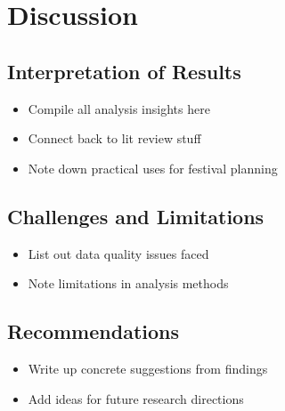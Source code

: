 \chapter{Discussion}
\label{ch:discussion}


\section{Interpretation of Results}
\label{sec:discussion-interpretation-results}
\begin{itemize}
    \item Compile all analysis insights here
    \item Connect back to lit review stuff
    \item Note down practical uses for festival planning
\end{itemize}


\section{Challenges and Limitations}
\label{sec:discussion-challenges-limitations}
\begin{itemize}
    \item List out data quality issues faced
    \item Note limitations in analysis methods
\end{itemize}


\section{Recommendations}
\label{sec:discussion-recommendations}
\begin{itemize}
    \item Write up concrete suggestions from findings
    \item Add ideas for future research directions
\end{itemize}


